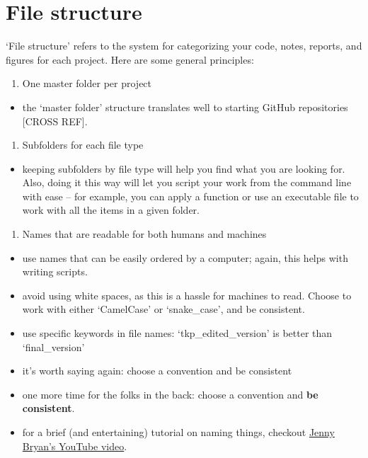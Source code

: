 \documentclass[
]{book}
\providecommand{\tightlist}{%
  \setlength{\itemsep}{0pt}\setlength{\parskip}{0pt}}
\begin{document}
\hypertarget{file-structure}{%
\section{File structure}\label{file-structure}}

`File structure' refers to the system for categorizing your code, notes, reports, and figures for each project. Here are some general principles:

\begin{enumerate}
\def\labelenumi{\arabic{enumi}.}
\tightlist
\item
  One master folder per project
\end{enumerate}

\begin{itemize}
\tightlist
\item
  the `master folder' structure translates well to starting GitHub repositories {[}CROSS REF{]}.
\end{itemize}

\begin{enumerate}
\def\labelenumi{\arabic{enumi}.}
\setcounter{enumi}{1}
\tightlist
\item
  Subfolders for each file type
\end{enumerate}

\begin{itemize}
\tightlist
\item
  keeping subfolders by file type will help you find what you are looking for. Also, doing it this way will let you script your work from the command line with ease -- for example, you can apply a function or use an executable file to work with all the items in a given folder.
\end{itemize}

\begin{enumerate}
\def\labelenumi{\arabic{enumi}.}
\setcounter{enumi}{2}
\tightlist
\item
  Names that are readable for both humans and machines
\end{enumerate}

\begin{itemize}
\tightlist
\item
  use names that can be easily ordered by a computer; again, this helps with writing scripts.
\item
  avoid using white spaces, as this is a hassle for machines to read. Choose to work with either `CamelCase' or `snake\_case', and be consistent.
\item
  use specific keywords in file names: `tkp\_edited\_version' is better than `final\_version'
\item
  it's worth saying again: choose a convention and be consistent
\item
  one more time for the folks in the back: choose a convention and \textbf{be consistent}.
\item
  for a brief (and entertaining) tutorial on naming things, checkout \href{https://www.youtube.com/watch?v=ES1LTlnpLMk}{Jenny Bryan's YouTube video}.
\end{itemize}
\end{document}
